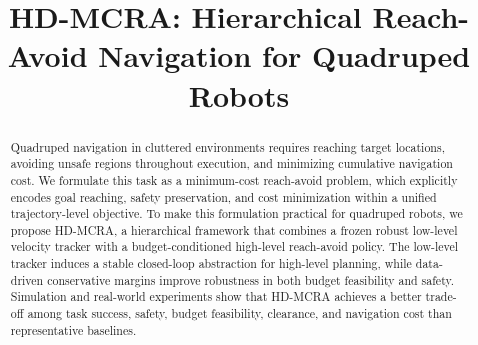 \documentclass[conference]{IEEEtran}
\begin{document}

\title{HD-MCRA: Hierarchical Reach-Avoid Navigation for Quadruped Robots}

\author{
\and
{}
\and
{}
}

\maketitle
{}

\begin{abstract}
Quadruped navigation in cluttered environments requires reaching target locations, avoiding unsafe regions throughout execution, and minimizing cumulative navigation cost. We formulate this task as a minimum-cost reach-avoid problem, which explicitly encodes goal reaching, safety preservation, and cost minimization within a unified trajectory-level objective. To make this formulation practical for quadruped robots, we propose HD-MCRA, a hierarchical framework that combines a frozen robust low-level velocity tracker with a budget-conditioned high-level reach-avoid policy. The low-level tracker induces a stable closed-loop abstraction for high-level planning, while data-driven conservative margins improve robustness in both budget feasibility and safety. Simulation and real-world experiments show that HD-MCRA achieves a better trade-off among task success, safety, budget feasibility, clearance, and navigation cost than representative baselines. 
\end{abstract}
\end{document}
